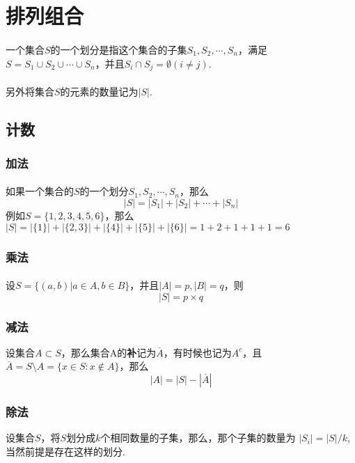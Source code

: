 \section{排列组合}

\paragraph{}
一个集合$S$的一个划分是指这个集合的子集$S_1, S_2, \cdots, S_n$，满足
$S = S_1 \cup S_2 \cup \cdots \cup S_n$，并且$S_i \cap S_j = \emptyset (i \neq j)$. 

\paragraph{}
另外将集合$S$的元素的数量记为$|S|$.

\subsection{计数}

\subsubsection{加法}
\paragraph{}
如果一个集合的$S$的一个划分$S_1, S_2, \cdots, S_n$，那么
$$
|S| = |S_1|+|S_2| + \cdots + |S_n|
$$
例如$S =  \{1, 2, 3, 4, 5, 6\}$，那么$|S| = |\{1\}| + |\{2, 3\}| + |\{4\}| + |\{5\}| + |\{6\}| = 1 + 2 + 1  + 1 + 1  = 6$

\subsubsection{乘法}
\paragraph{}
设$S = \{(a, b) | a \in A, b \in B\}$，并且$|A| = p, |B| = q$，则
$$
|S| = p \times q
$$

\subsubsection{减法}
设集合$A \subset S$，那么集合A的\textbf{补}记为$\overline{A}$，有时候也记为$A^c$，且$\overline{A} = S \setminus A = \{x \in S: x \notin A\} $，那么
$$
|A| = |S| - |\overline{A}|
$$

\subsubsection{除法}
设集合$S$，将$S$划分成$k$个相同数量的子集，那么，那个子集的数量为
$|S_i| =  |S| / k$, 当然前提是存在这样的划分.

